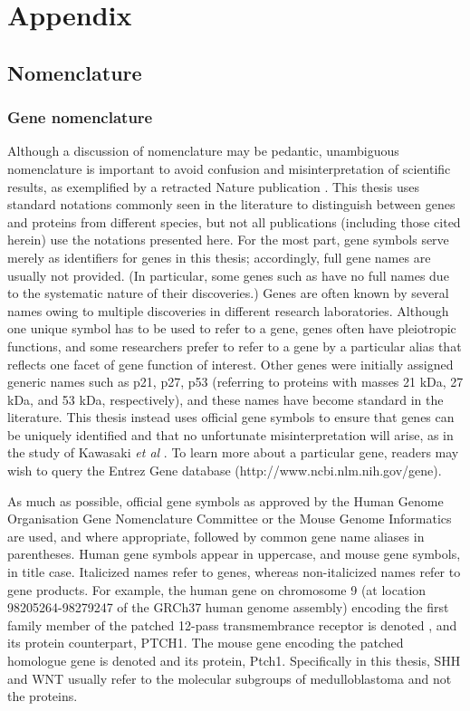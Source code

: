 \chapter{Appendix}
\label{ch:appendix}

\section{Nomenclature}
\label{sec:nomenclature}

\subsection{Gene nomenclature}

Although a discussion of nomenclature may be pedantic, unambiguous nomenclature is important to avoid confusion and misinterpretation of scientific results, as exemplified by a retracted Nature publication . This thesis uses standard notations commonly seen in the literature to distinguish between genes and proteins from different species, but not all publications (including those cited herein) use the notations presented here. For the most part, gene symbols serve merely as identifiers for genes in this thesis; accordingly, full gene names are usually not provided. (In particular, some genes such as  have no full names due to the systematic nature of their discoveries.) Genes are often known by several names owing to multiple discoveries in different research laboratories. Although one unique symbol has to be used to refer to a gene, genes often have pleiotropic functions, and some researchers prefer to refer to a gene by a particular alias that reflects one facet of gene function of interest. Other genes were initially assigned generic names such as p21, p27, p53 (referring to proteins with masses 21 kDa, 27 kDa, and 53 kDa, respectively), and these names have become standard in the literature. This thesis instead uses official gene symbols to ensure that genes can be uniquely identified and that no unfortunate misinterpretation will arise, as in the study of Kawasaki \emph{et al} . To learn more about a particular gene, readers may wish to query the Entrez Gene database ({http://www.ncbi.nlm.nih.gov/gene}).

As much as possible, official gene symbols as approved by the Human Genome Organisation Gene Nomenclature Committee or the Mouse Genome Informatics are used, and where appropriate, followed by common gene name aliases in parentheses. Human gene symbols appear in uppercase, and mouse gene symbols, in title case. Italicized names refer to genes, whereas non-italicized names refer to gene products. For example, the human gene on chromosome 9 (at location 98205264-98279247 of the GRCh37 human genome assembly) encoding the first family member of the patched 12-pass transmembrance receptor is denoted , and its protein counterpart, PTCH1. The mouse gene encoding the patched homologue gene is denoted  and its protein, Ptch1. Specifically in this thesis, SHH and WNT usually refer to the molecular subgroups of medulloblastoma and not the proteins.

